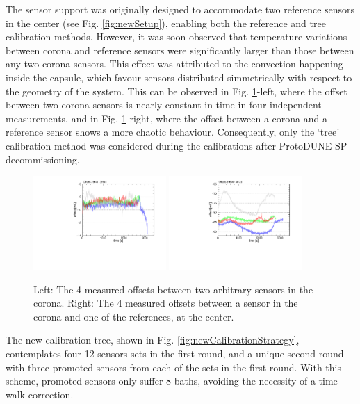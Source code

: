 The sensor support was originally designed to accommodate two reference sensors in the center (see Fig. \ref{fig:newSetup}), enabling both the reference and tree calibration methods. However, it was soon observed that temperature variations between corona and reference sensors were significantly larger than those between any two corona sensors. This effect was attributed to the convection happening inside the capsule, which favour sensors distributed simmetrically with respect to the geometry of the system. This can be observed in Fig. \ref{fig:refMethodDumpingJustification}-left, where the offset between two corona sensors is nearly constant in time in four independent measurements, and in Fig. \ref{fig:refMethodDumpingJustification}-right, where the offset between a corona and a reference sensor shows a more chaotic behaviour. Consequently, only the `tree' calibration method was considered during the calibrations after ProtoDUNE-SP decommissioning. 

\begin{figure}[htbp]
\centering
{\includegraphics[width=0.45\textwidth]{images/figure_15_a.pdf}}
{\includegraphics[width=0.45\textwidth]{images/figure_15_b.pdf}}
\caption{Left: The 4 measured offsets between two arbitrary sensors in the corona. Right: The 4 measured offsets between a sensor in the corona and one of the references, at the center.}
\label{fig:refMethodDumpingJustification}
\end{figure}

The new calibration tree, shown in Fig. \ref{fig:newCalibrationStrategy}, contemplates four 12-sensors sets in the first round, and a unique second round with three promoted sensors from each of the sets in the first round. With this scheme, promoted sensors only suffer 8 baths, avoiding the necessity of a time-walk correction.

